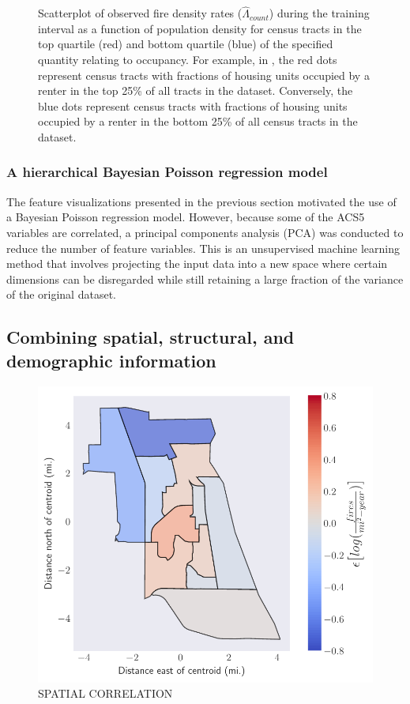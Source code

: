 \documentclass{svjour3}
\begin{document}
\begin{figure}[!ht]
\begin{center}
{          }
      \end{center}
      \caption{Scatterplot of observed fire density rates ($\hat\Lambda_{count}$) during the training interval as a function of population density for census tracts in the top quartile (red) and bottom quartile (blue) of the specified quantity relating to occupancy. For example, in \protect{}, the red dots represent census tracts with fractions of housing units occupied by a renter in the top 25\% of all tracts in the dataset. Conversely, the blue dots represent census tracts with fractions of housing units occupied by a renter in the bottom 25\% of all census tracts in the dataset.}
     \label{fig:occupancy}
  \end{figure}
 
 
 \clearpage
  \subsubsection{A hierarchical Bayesian Poisson regression model}
  The feature visualizations presented in the previous section motivated the use of a Bayesian Poisson regression model. However, because some of the ACS5 variables are correlated, a principal components analysis (PCA) was conducted to reduce the number of feature variables. This is an unsupervised machine learning method that involves projecting the input data into a new space where certain dimensions can be disregarded while still retaining a large fraction of the variance of the original dataset. 
  
  
  
  
  
  
  \subsection{Combining spatial, structural, and demographic information}
  
  
  
\begin{figure}[htb] \centering
\includegraphics[width=.75\textwidth]{figures/spatial_correlation.pdf}
\caption{SPATIAL CORRELATION}
\label{fig:spatialcorr}
\end{figure}
\end{document}
